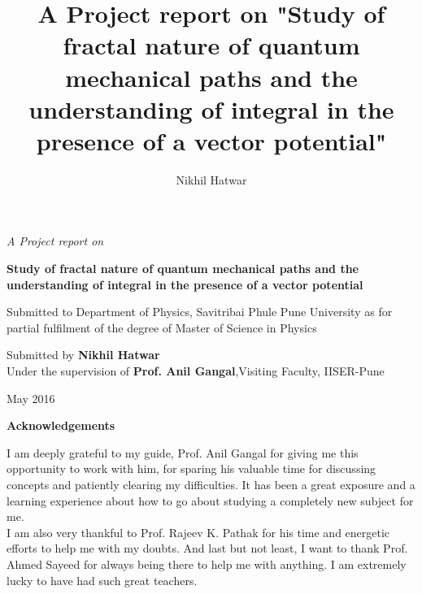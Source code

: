 \documentclass[14pt]{extarticle}
\title{A Project report on "Study of fractal nature of quantum mechanical paths and the understanding of integral in the presence of a vector potential"}
\author{Nikhil Hatwar}
\begin{document}
\begin{center}

\bigskip\bigskip\bigskip\bigskip\bigskip\bigskip
\bigskip\bigskip\bigskip\bigskip\bigskip\bigskip
\begin{LARGE}
\textit{A Project report on} \\
\bigskip\bigskip\bigskip\bigskip

\textbf{Study of fractal nature of quantum mechanical paths and the understanding of integral in the presence of a vector potential}
\end{LARGE}

\bigskip\bigskip\bigskip\bigskip
\bigskip\bigskip\bigskip\bigskip

Submitted to Department of Physics, Savitribai Phule Pune University as for partial fulfilment of the degree of Master of Science in Physics


\bigskip\bigskip\bigskip\bigskip
\bigskip\bigskip\bigskip\bigskip

Submitted by \textbf{Nikhil Hatwar}\\
Under the supervision of \textbf{Prof. Anil Gangal},Visiting Faculty, IISER-Pune

\bigskip\bigskip\bigskip\bigskip
\bigskip\bigskip\bigskip\bigskip
\bigskip\bigskip\bigskip\bigskip
\bigskip\bigskip\bigskip\bigskip


\begin{LARGE}
May 2016
\end{LARGE}
\end{center}


\newpage

\begin{center}
\begin{LARGE}
\textbf{Acknowledgements}
\end{LARGE}
\end{center}


I am deeply grateful to my guide, Prof. Anil Gangal for giving me this opportunity to work with him, for sparing his valuable time for discussing concepts and patiently clearing my difficulties. It has been a great exposure and a learning experience about how to go about studying a completely new subject for me.
\\

 I am also very thankful to Prof. Rajeev K. Pathak for his time and energetic efforts to help me with my doubts. And last but not least, I want to thank Prof. Ahmed Sayeed for always being there to help me with anything. I am extremely lucky to have had such great teachers.
\end{document}
